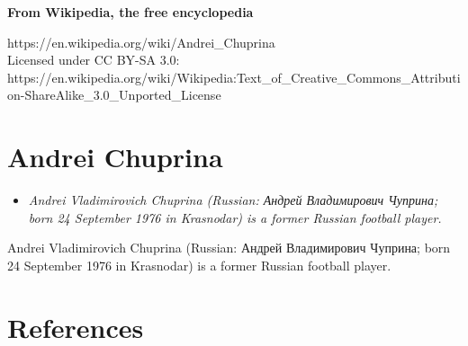 \textbf{From Wikipedia, the free encyclopedia}

https://en.wikipedia.org/wiki/Andrei\_Chuprina\\
Licensed under CC BY-SA 3.0:\\
https://en.wikipedia.org/wiki/Wikipedia:Text\_of\_Creative\_Commons\_Attribution-ShareAlike\_3.0\_Unported\_License

\section{Andrei Chuprina}\label{andrei-chuprina}

\begin{itemize}
\item
  \emph{Andrei Vladimirovich Chuprina (Russian: Андрей Владимирович
  Чуприна; born 24 September 1976 in Krasnodar) is a former Russian
  football player.}
\end{itemize}

Andrei Vladimirovich Chuprina (Russian: Андрей Владимирович Чуприна;
born 24 September 1976 in Krasnodar) is a former Russian football
player.

\section{References}\label{references}
